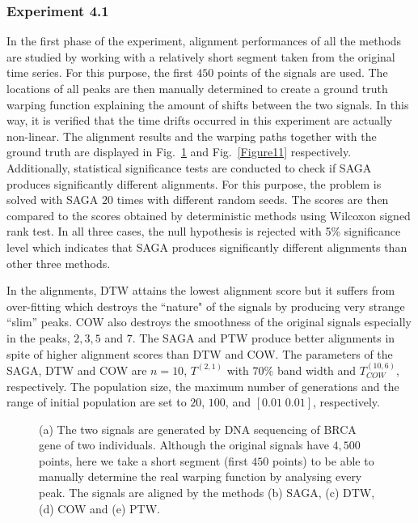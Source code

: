 \documentclass[number,1p,12pt]{elsarticle}
\begin{document}
\subsubsection{Experiment 4.1}
In the first phase of the experiment, alignment performances of all the methods are studied by working with a relatively short segment taken from the original time series. For this purpose, the first $450$ points of the signals are used. The locations of all peaks are then manually determined to create a ground truth warping function explaining the amount of shifts between the two signals. In this way, it is verified that the time drifts occurred in this experiment are actually non-linear. The alignment results and the warping paths together with the ground truth are displayed in Fig.~\ref{Figure10} and Fig.~\ref{Figure11} respectively. Additionally, statistical significance tests are conducted to check if SAGA produces significantly different alignments. For this purpose, the problem is solved with SAGA $20$ times with different random seeds. The scores are then  compared to the scores obtained by deterministic methods using Wilcoxon signed rank test. In all three cases, the null hypothesis is rejected with 5\% significance level which indicates that SAGA produces significantly different alignments than other three methods. 

In the alignments, DTW attains the lowest alignment score but it suffers from over-fitting which destroys the ``nature" of the signals by producing very strange ``slim'' peaks.  COW also destroys the smoothness of the original signals especially in the peaks, $2, 3, 5$ and $7$. The SAGA and PTW produce better alignments in spite of higher alignment scores than DTW and COW. The parameters of the SAGA, DTW and COW are $n=10$, $T^{(2,1)}$ with $70\%$ band width and $T_{COW}^{(10,6)}$, respectively. The population size, the maximum number of generations and the range of initial population are set to $20$, $100$, and $[0.01\;0.01]$, respectively.

\begin{figure}
\caption{(a) The two signals are generated by DNA sequencing of BRCA gene of two individuals. Although the original signals have $4,500$ points,  here we take a short segment (first $450$ points) to be able to manually determine the real warping function by analysing every peak.  The signals are aligned by the methods (b) SAGA, (c) DTW, (d) COW and (e) PTW. }
\label{Figure10}
\end{figure} 
\end{document}
